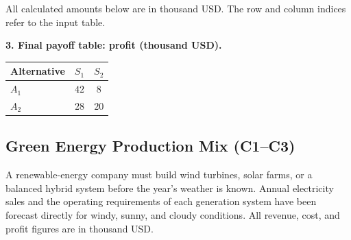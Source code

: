 All calculated amounts below are in thousand USD. The row and column indices refer to the input table.


\noindent\begin{minipage}{\linewidth}
\textbf{3. Final payoff table: profit (thousand USD).}
\begin{center}
\begin{tabular}{@{}lcc@{}}
\toprule
Alternative & \(S_1\) & \(S_2\) \\
\midrule
\(A_1\) & \(42\) & \(8\) \\
\(A_2\) & \(28\) & \(20\) \\
\bottomrule
\end{tabular}
\end{center}
\end{minipage}




	\subsection{Green Energy Production Mix (C1--C3)}
	\label{sec:problem4-green-energy-production-mix-c1-c3}

	A renewable-energy company must build wind turbines, solar farms, or a balanced hybrid system before the year's weather is known. Annual electricity sales and the operating requirements of each generation system have been forecast directly for windy, sunny, and cloudy conditions. All revenue, cost, and profit figures are in thousand USD.

